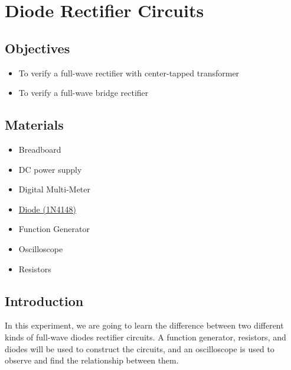 \chapter{Diode Rectifier Circuits}


\section{Objectives}
\begin{itemize}
    \item To verify a full-wave rectifier with center-tapped transformer
    \item To verify a full-wave bridge rectifier
\end{itemize}

\section{Materials}
\begin{itemize}
    \item Breadboard
    \item DC power supply
    \item Digital Multi-Meter
    \item \hyperref[1N4148]{Diode (1N4148)}
    \item Function Generator
    \item Oscilloscope
    \item Resistors
\end{itemize}

\section{Introduction}
In this experiment, we are going to learn the difference between two different kinds of full-wave diodes rectifier circuits. A function generator, resistors, and diodes will be used to construct the circuits, and an oscilloscope is used to observe and find the relationship between them.
